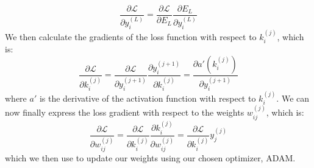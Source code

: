\documentclass[12pt]{article}
\begin{document}
{\begin{equation*}
    \frac{\partial \mathcal{L}}{\partial y_i^{(L)}}  = \frac{\partial \mathcal{L}}{\partial E_L}  \frac{\partial E_L}{\partial y_i^{(L)}} 
\end{equation*}
We then calculate the gradients of the loss function with respect to $k_i^{(j)}$, which is:
\begin{equation*}
    \frac{\partial \mathcal{L}}{\partial k_i^{(j)}} = \frac{\partial \mathcal{L}}{\partial y_i^{(j+1)}}  \frac{\partial y_i^{(j+1)}}{\partial k_i^{(j)}}  = \frac{\partial a'(k_i^{(j)})}{\partial y_i^{(j+1)}} 
\end{equation*}
where $a'$ is the derivative of the activation function with respect to $k_i^{(j)}$.\newline
We can now finally express the loss gradient with respect to the weights $w_{ij}^{(j)}$, which is:
\begin{equation*}
    \frac{\partial \mathcal{L}}{\partial w_{ij}^{(j)}} = \frac{\partial \mathcal{L}}{\partial k_i^{(j)}}  \frac{\partial k_i^{(j)}}{\partial w_{ij}^{(j)}}  = \frac{\partial \mathcal{L}}{\partial k_i^{(j)}}  y_j^{(j)}
\end{equation*}
which we then use to update our weights using our chosen optimizer, ADAM.
}
\end{document}
